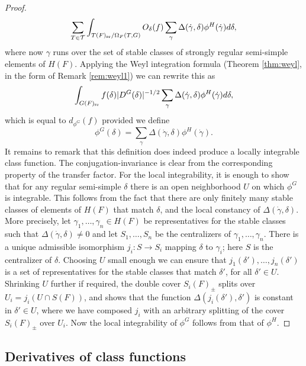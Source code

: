 \documentclass{article}
\theoremstyle{definition}
\numberwithin{equation}{section}
\renewcommand{\-}{\hyp{}}
\begin{document}
\begin{proof}
\[	\sum_{T \in \mathcal{T}} \int_{T(F)_{\textrm{sr}}/\Omega_F(T,G)}O_\delta(f) \sum_\gamma \Delta(\dot\gamma,\delta) \phi^H(\dot\gamma) d\delta,	
	\] 
	where now $\gamma$ runs over the set of stable classes of strongly regular semi-simple elements of $H(F)$. Applying the Weyl integration formula (Theorem \ref{thm:weyl}, in the form of Remark \ref{rem:weyl1}) we can rewrite this as 
	\begin{equation} \label{eq:x3}
	\int_{G(F)_{\textrm{sr}}}f(\delta) |D^G(\delta)|^{-1/2}\sum_\gamma \Delta(\dot\gamma,\delta) \phi^H(\dot\gamma) d\delta,
	\end{equation}
	which is equal to $d_{\phi^G}(f)$ provided we define
	\begin{equation} \label{eq:x4}
		\phi^G(\delta) = \sum_\gamma \Delta(\dot\gamma,\delta) \phi^H(\dot\gamma).
	\end{equation}
	It remains to remark that this definition does indeed produce a locally integrable class function. The conjugation-invariance is clear from the corresponding property of the transfer factor. For the local integrability, it is enough to show that for any regular semi-simple $\delta$ there is an open neighborhood $U$ on which $\phi^G$ is integrable. This follows from the fact that there are only finitely many stable classes of elements of $H(F)$ that match $\delta$, and the local constancy of $\Delta(\dot\gamma,\delta)$. More precisely, let $\gamma_1,\dots,\gamma_n \in H(F)$ be representatives for the stable classes such that $\Delta(\dot\gamma,\delta) \neq 0$ and let $S_1,\dots,S_n$ be the centralizers of $\gamma_1,\dots,\gamma_n$. There is a unique admissible isomorphism $j_i : S \to S_i$ mapping $\delta$ to $\gamma_i$; here $S$ is the centralizer of $\delta$. Choosing $U$ small enough we can ensure that $j_1(\delta'),\dots,j_n(\delta')$ is a set of representatives for the stable classes that match $\delta'$, for all $\delta' \in U$. Shrinking $U$ further if required, the double cover $S_i(F)_\pm$ splits over $U_i=j_i(U \cap S(F))$, and \cite[Corollary 4.3.4]{KalHDC} shows that the function $\Delta(j_i(\delta'),\delta')$ is constant in $\delta' \in U$, where we have composed $j_i$ with an arbitrary splitting of the cover $S_i(F)_\pm$ over $U_i$. Now the local integrability of $\phi^G$ follows from that of $\phi^H$.
\end{proof}

\subsection{Derivatives of class functions}
\end{document}
